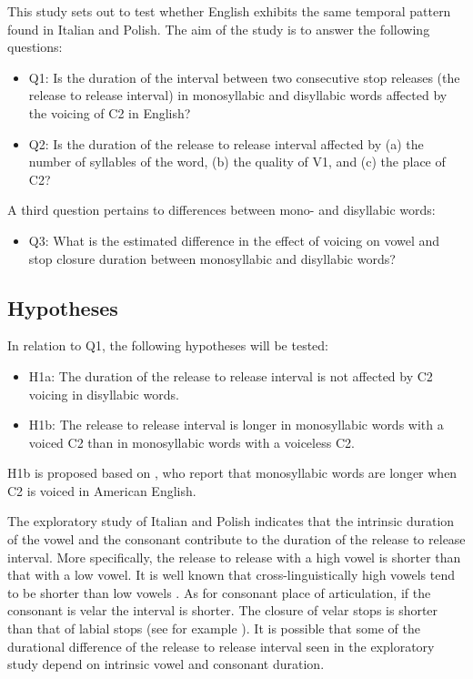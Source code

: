 \documentclass[11pt,]{article}
\providecommand{\tightlist}{%
  \setlength{\itemsep}{0pt}\setlength{\parskip}{0pt}}
\begin{document}
This study sets out to test whether English exhibits the same temporal
pattern found in Italian and Polish. The aim of the study is to answer
the following questions:

\begin{itemize}
\tightlist
\item
  Q1: Is the duration of the interval between two consecutive stop
  releases (the release to release interval) in monosyllabic and
  disyllabic words affected by the voicing of C2 in English?
\item
  Q2: Is the duration of the release to release interval affected by (a)
  the number of syllables of the word, (b) the quality of V1, and (c)
  the place of C2?
\end{itemize}

A third question pertains to differences between mono- and disyllabic
words:

\begin{itemize}
\tightlist
\item
  Q3: What is the estimated difference in the effect of voicing on vowel
  and stop closure duration between monosyllabic and disyllabic words?
\end{itemize}

\hypertarget{hypotheses}{%
\subsection{Hypotheses}\label{hypotheses}}

In relation to Q1, the following hypotheses will be tested:

\begin{itemize}
\tightlist
\item
  H1a: The duration of the release to release interval is not affected
  by C2 voicing in disyllabic words.
\item
  H1b: The release to release interval is longer in monosyllabic words
  with a voiced C2 than in monosyllabic words with a voiceless C2.
\end{itemize}

H1b is proposed based on \citet{jacewicz2009}, who report that
monosyllabic words are longer when C2 is voiced in American English.

The exploratory study of Italian and Polish indicates that the intrinsic
duration of the vowel and the consonant contribute to the duration of
the release to release interval. More specifically, the release to
release with a high vowel is shorter than that with a low vowel. It is
well known that cross-linguistically high vowels tend to be shorter than
low vowels
\citep{hertrich1997, esposito2002, mortensen2013, toivonen2015, kawahara2017}.
As for consonant place of articulation, if the consonant is velar the
interval is shorter. The closure of velar stops is shorter than that of
labial stops (see for example \citealt{sharf1962}). It is possible that
some of the durational difference of the release to release interval
seen in the exploratory study depend on intrinsic vowel and consonant
duration.
\end{document}
